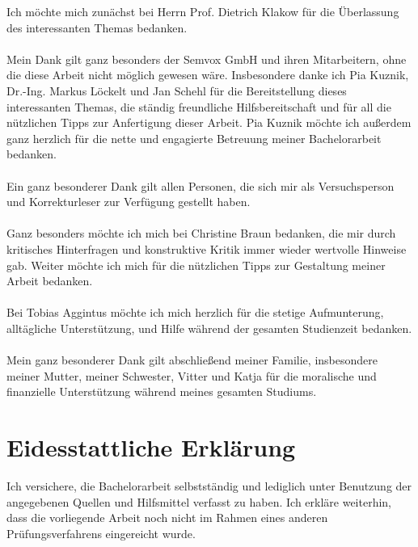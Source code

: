 \documentclass[12pt,a4paper]{scrartcl}
\begin{document}
Ich möchte mich zunächst bei Herrn Prof. Dietrich Klakow für die Überlassung des interessanten Themas bedanken.\\
\\
Mein Dank gilt ganz besonders der Semvox GmbH und ihren Mitarbeitern, ohne die diese Arbeit nicht möglich gewesen wäre. Insbesondere danke ich Pia Kuznik, Dr.-Ing. Markus Löckelt und Jan Schehl für die Bereitstellung dieses interessanten Themas, die ständig freundliche Hilfsbereitschaft und für all die nützlichen Tipps zur Anfertigung dieser Arbeit. 
Pia Kuznik möchte ich außerdem ganz herzlich für die nette und engagierte Betreuung meiner Bachelorarbeit bedanken.\\
\\
Ein ganz besonderer Dank gilt allen Personen, die sich mir als Versuchsperson und Korrekturleser zur Verfügung
gestellt haben.\\
\\
Ganz besonders möchte ich mich bei Christine Braun bedanken, die mir durch kritisches Hinterfragen und konstruktive Kritik immer wieder wertvolle Hinweise gab. Weiter möchte ich mich für die nützlichen Tipps zur Gestaltung meiner Arbeit bedanken.\\
\\
Bei Tobias Aggintus möchte ich mich herzlich für die stetige Aufmunterung, alltägliche Unterstützung, 
und Hilfe während der gesamten Studienzeit bedanken. \\
\\
Mein ganz besonderer Dank gilt abschließend meiner Familie, insbesondere meiner Mutter, meiner Schwester, Vitter und Katja für die moralische und finanzielle Unterstützung während meines gesamten Studiums. \\
\cfoot{}
\cleardoublepage

\section*{Eidesstattliche Erklärung}

\cfoot{}
Ich versichere, die Bachelorarbeit selbstständig und lediglich unter Benutzung der angegebenen Quellen und Hilfsmittel verfasst zu haben.
\newline
\newline
Ich erkläre weiterhin, dass die vorliegende Arbeit noch nicht im Rahmen eines anderen Prüfungsverfahrens eingereicht wurde.
\newline
\newline
\end{document}
